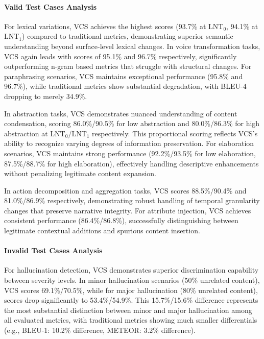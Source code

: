 \documentclass[main.tex]{subfiles}
\begin{document}
\paragraph{Valid Test Cases Analysis}
For lexical variations, VCS achieves the highest scores (93.7\% at LNT$_0$, 94.1\% at LNT$_1$) compared to traditional metrics, demonstrating superior semantic understanding beyond surface-level lexical changes. In voice transformation tasks, VCS again leads with scores of 95.1\% and 96.7\% respectively, significantly outperforming n-gram based metrics that struggle with structural changes. For paraphrasing scenarios, VCS maintains exceptional performance (95.8\% and 96.7\%), while traditional metrics show substantial degradation, with BLEU-4 dropping to merely 34.9\%.

In abstraction tasks, VCS demonstrates nuanced understanding of content condensation, scoring 86.0\%/90.5\% for low abstraction and 80.0\%/86.3\% for high abstraction at LNT$_0$/LNT$_1$ respectively. This proportional scoring reflects VCS's ability to recognize varying degrees of information preservation. For elaboration scenarios, VCS maintains strong performance (92.2\%/93.5\% for low elaboration, 87.5\%/88.7\% for high elaboration), effectively handling descriptive enhancements without penalizing legitimate content expansion.

In action decomposition and aggregation tasks, VCS scores 88.5\%/90.4\% and 81.0\%/86.9\% respectively, demonstrating robust handling of temporal granularity changes that preserve narrative integrity. For attribute injection, VCS achieves consistent performance (86.4\%/86.8\%), successfully distinguishing between legitimate contextual additions and spurious content insertion.

\paragraph{Invalid Test Cases Analysis}
For hallucination detection, VCS demonstrates superior discrimination capability between severity levels. In minor hallucination scenarios (50\% unrelated content), VCS scores 69.1\%/70.5\%, while for major hallucination (80\% unrelated content), scores drop significantly to 53.4\%/54.9\%. This 15.7\%/15.6\% difference represents the most substantial distinction between minor and major hallucination among all evaluated metrics, with traditional metrics showing much smaller differentials (e.g., BLEU-1: 10.2\% difference, METEOR: 3.2\% difference).
\end{document}
